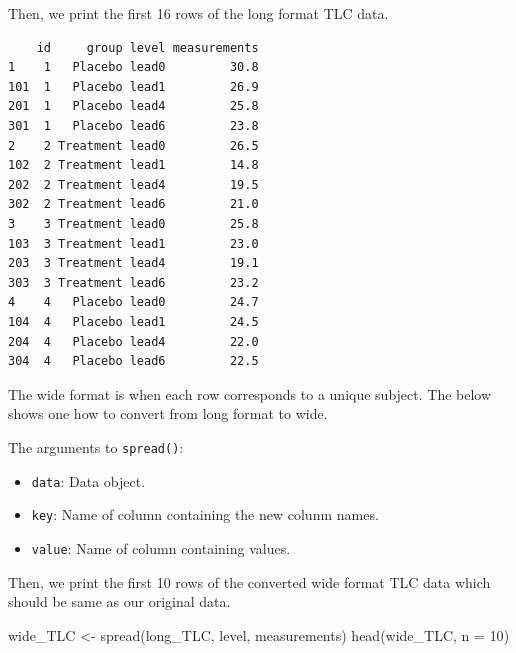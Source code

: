 \documentclass[
  letterpaper,
  DIV=11,
  numbers=noendperiod]{scrreprt}
\newenvironment{Shaded}{\begin{snugshade}}{\end{snugshade}}
\newcommand{\AttributeTok}[1]{\textcolor[rgb]{0.40,0.45,0.13}{#1}}
\newcommand{\ConstantTok}[1]{\textcolor[rgb]{0.56,0.35,0.01}{#1}}
\newcommand{\DecValTok}[1]{\textcolor[rgb]{0.68,0.00,0.00}{#1}}
\newcommand{\FunctionTok}[1]{\textcolor[rgb]{0.28,0.35,0.67}{#1}}
\newcommand{\NormalTok}[1]{\textcolor[rgb]{0.00,0.23,0.31}{#1}}
\newcommand{\OtherTok}[1]{\textcolor[rgb]{0.00,0.23,0.31}{#1}}
\newcommand{\SpecialCharTok}[1]{\textcolor[rgb]{0.37,0.37,0.37}{#1}}
\providecommand{\tightlist}{%
  \setlength{\itemsep}{0pt}\setlength{\parskip}{0pt}}\usepackage{longtable,booktabs,array}
\begin{document}
Then, we print the first 16 rows of the long format TLC data.

\begin{Shaded}
\end{Shaded}

\begin{verbatim}
    id     group level measurements
1    1   Placebo lead0         30.8
101  1   Placebo lead1         26.9
201  1   Placebo lead4         25.8
301  1   Placebo lead6         23.8
2    2 Treatment lead0         26.5
102  2 Treatment lead1         14.8
202  2 Treatment lead4         19.5
302  2 Treatment lead6         21.0
3    3 Treatment lead0         25.8
103  3 Treatment lead1         23.0
203  3 Treatment lead4         19.1
303  3 Treatment lead6         23.2
4    4   Placebo lead0         24.7
104  4   Placebo lead1         24.5
204  4   Placebo lead4         22.0
304  4   Placebo lead6         22.5
\end{verbatim}

The wide format is when each row corresponds to a unique subject. The
below shows one how to convert from long format to wide.

The arguments to \texttt{spread()}:

\begin{itemize}
\tightlist
\item
  \texttt{data}: Data object.
\item
  \texttt{key}: Name of column containing the new column names.
\item
  \texttt{value}: Name of column containing values.
\end{itemize}

Then, we print the first 10 rows of the converted wide format TLC data
which should be same as our original data.

\begin{Shaded}
\begin{Highlighting}[]
\NormalTok{wide\_TLC }\OtherTok{\textless{}{-}} \FunctionTok{spread}\NormalTok{(long\_TLC, level, measurements)}
\FunctionTok{head}\NormalTok{(wide\_TLC, }\AttributeTok{n =} \DecValTok{10}\NormalTok{)}
\end{Highlighting}
\end{Shaded}
\end{document}
